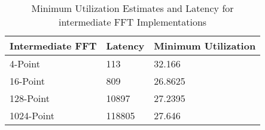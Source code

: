 \begin{table}[H]
\centering
\caption{Minimum Utilization Estimates and Latency for intermediate FFT Implementations}
\label{min_area}
\begin{tabular}{||m{4cm}|m{2.5cm}|m{2.5cm}||}
\hline
Intermediate FFT & Latency & Minimum Utilization\\
\hline
4-Point&113&32.166\\
\hline
16-Point &809&26.8625\\
\hline
128-Point & 10897&27.2395 \\
\hline
1024-Point & 118805&27.646\\
\hline
\end{tabular}
\end{table}